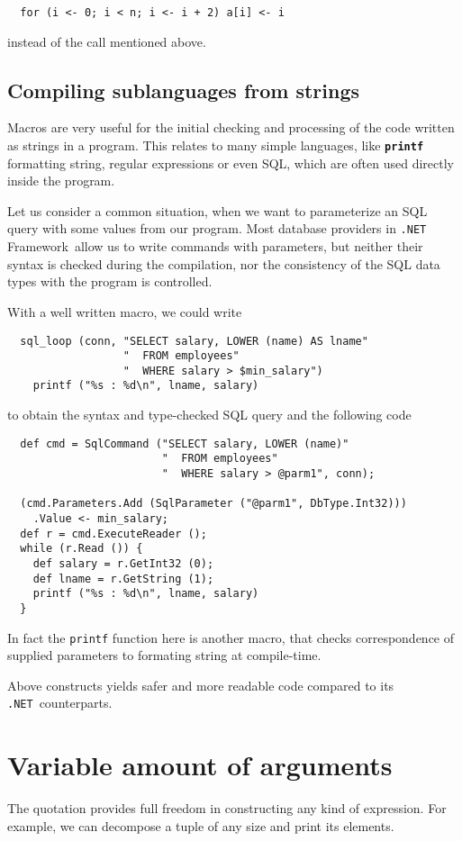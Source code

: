 \documentclass{llncs}
\newcommand{\net}[0]{{\tt .NET}}
\newcommand{\netf}[0]{{\tt .NET} Framework}
\newcommand{\kw}[1]{{\tt \bf #1}}
\begin{document}
\begin{verbatim}
  for (i <- 0; i < n; i <- i + 2) a[i] <- i
\end{verbatim}

\noindent
instead of the call mentioned above.

\subsection{Compiling sublanguages from strings}
Macros are very useful for the initial checking and processing of the code
written as strings in a program. This relates to many simple languages,
like \kw{printf} formatting string, regular expressions or even SQL, which are 
often used directly inside the program. 

Let us consider a common situation, when we want to parameterize an SQL query
with some values from our program. Most database providers in 
\netf\ allow us to write commands with parameters, but neither their syntax 
is checked during the compilation, nor the consistency of the SQL data types 
with the program is controlled.

With a well written macro, we could write
\begin{verbatim}
  sql_loop (conn, "SELECT salary, LOWER (name) AS lname"
                  "  FROM employees"
                  "  WHERE salary > $min_salary")
    printf ("%s : %d\n", lname, salary)
\end{verbatim} %

to obtain the syntax and type-checked SQL query and the following code
\begin{verbatim}
  def cmd = SqlCommand ("SELECT salary, LOWER (name)"
                        "  FROM employees"
                        "  WHERE salary > @parm1", conn);

  (cmd.Parameters.Add (SqlParameter ("@parm1", DbType.Int32)))
    .Value <- min_salary;
  def r = cmd.ExecuteReader ();
  while (r.Read ()) {
    def salary = r.GetInt32 (0);
    def lname = r.GetString (1);
    printf ("%s : %d\n", lname, salary)
  }
\end{verbatim}

In fact the \verb,printf, function here is another macro, that checks
correspondence of supplied parameters to formating string at compile-time.

Above constructs yields safer and more readable code compared to its
\net\ counterparts.

\section{Variable amount of arguments}
The quotation provides full freedom in constructing any kind of expression.
For example, we can decompose a tuple of any size and print its elements.
\end{document}
